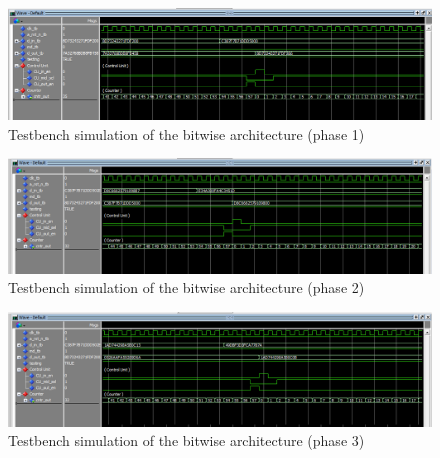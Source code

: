\begin{figure}[H]
    \begin{center}
        \includegraphics[scale=.6,clip]{img/test_bit_phase1.png}
    \end{center}
    \vspace*{-0.5cm}
    \caption{Testbench simulation of the bitwise architecture (phase 1)}
    \label{fig:test_bit_phase1}
\end{figure}

\begin{figure}[H]
    \begin{center}
        \includegraphics[scale=.6,clip]{img/test_bit_phase2.png}
    \end{center}
    \vspace*{-0.5cm}
    \caption{Testbench simulation of the bitwise architecture (phase 2)}
    \label{fig:test_bit_phase2}
\end{figure}

\begin{figure}[H]
    \begin{center}
        \includegraphics[scale=.6,clip]{img/test_bit_phase3.png}
    \end{center}
    \vspace*{-0.5cm}
    \caption{Testbench simulation of the bitwise architecture (phase 3)}
    \label{fig:test_bit_phase3}
\end{figure}

